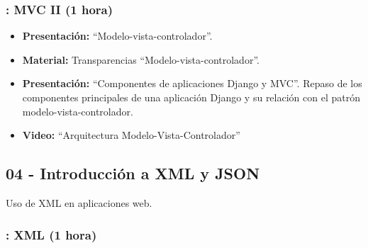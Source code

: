 \documentclass[a4paper,12pt]{article}
\begin{document}
\subsubsection{\martesH: MVC II (1 hora)}
\label{cal:martesH}


\begin{itemize}
\item \textbf{Presentación:} ``Modelo-vista-controlador''.
\item \textbf{Material:} Transparencias ``Modelo-vista-controlador''.
\item \textbf{Presentación:} ``Componentes de aplicaciones Django y MVC''.
  Repaso de los componentes principales de una aplicación Django y su relación con el patrón modelo-vista-controlador.
\item \textbf{Video:} ``Arquitectura Modelo-Vista-Controlador''
\end{itemize}


\subsection{04 - Introducción a XML y JSON}

Uso de XML en aplicaciones web.

\subsubsection{\martesI: XML (1 hora)}
\label{cal:martesI}
\end{document}
